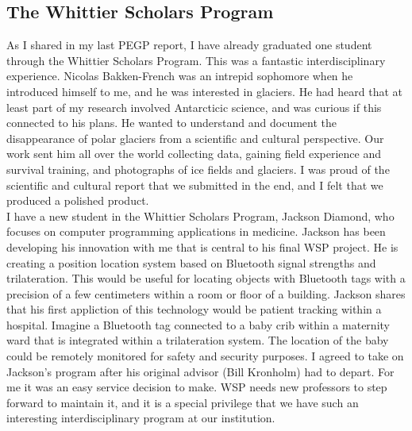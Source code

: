 \documentclass[../../../main.tex]{subfiles}
\begin{document}
\subsection{The Whittier Scholars Program}

As I shared in my last PEGP report, I have already graduated one student through the Whittier Scholars Program.  This was a fantastic interdisciplinary experience.  Nicolas Bakken-French was an intrepid sophomore when he introduced himself to me, and he was interested in glaciers.  He had heard that at least part of my research involved Antarcticic science, and was curious if this connected to his plans.  He wanted to understand and document the disappearance of polar glaciers from a scientific and cultural perspective.  Our work sent him all over the world collecting data, gaining field experience and survival training, and photographs of ice fields and glaciers.  I was proud of the scientific and cultural report that we submitted in the end, and I felt that we produced a polished product.
\\
\vspace{0.25cm}
I have a new student in the Whittier Scholars Program, Jackson Diamond, who focuses on computer programming applications in medicine.  Jackson has been developing his innovation with me that is central to his final WSP project.  He is creating a position location system based on Bluetooth signal strengths and trilateration.  This would be useful for locating objects with Bluetooth tags with a precision of a few centimeters within a room or floor of a building.  Jackson shares that his first appliction of this technology would be patient tracking within a hospital.  Imagine a Bluetooth tag connected to a baby crib within a maternity ward that is integrated within a trilateration system.  The location of the baby could be remotely monitored for safety and security purposes.  I agreed to take on Jackson's program after his original advisor (Bill Kronholm) had to depart.  For me it was an easy service decision to make.  WSP needs new professors to step forward to maintain it, and it is a special privilege that we have such an interesting interdisciplinary program at our institution.
\\
\vspace{0.25cm}
\end{document}
